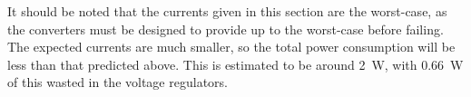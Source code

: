 
It should be noted that the currents given in this section are the worst-case, as the converters must be designed to provide up to the worst-case before failing. The expected currents are much smaller, so the total power consumption will be less than that predicted above. This is estimated to be around \SI{2}{\watt}, with \SI{0.66}{\watt} of this wasted in the voltage regulators.\\

